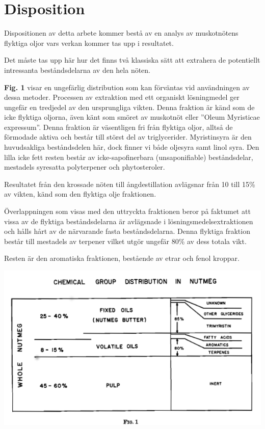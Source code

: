 \documentclass[a4paper,margin=3.25cm]{article}
\begin{document}
	\section{Disposition}

Dispositionen av detta arbete kommer bestå av en analys av muskotnötens flyktiga oljor
vars verkan kommer tas upp i resultatet.

Det måste tas upp här hur det finns två klassiska sätt att extrahera de potentiellt intressanta beståndsdelarna av den hela nöten.

\textbf{Fig. 1} \cite{shulgin1967chemistry} visar en ungefärlig distribution som kan förväntas vid användningen av dessa metoder. Processen av extraktion med ett organiskt lösningmedel ger ungefär en tredjedel av den ursprungliga vikten. Denna fraktion är känd som de icke flyktiga oljorna, även känt som smöret av muskotnöt eller ''Oleum Myristicae expressum''. Denna fraktion är väsentligen fri från flyktiga oljor, alltså de förmodade aktiva och består till störst del av triglycerider. Myristinsyra är den huvudsakliga beståndsdelen här, dock finner vi både oljesyra samt linol syra. Den lilla icke fett resten består av icke-sapofinerbara (unsaponifiable) beståndsdelar, mestadels syresatta polyterpener och phytosteroler. \cite{shulgin1967chemistry}

Resultatet från den krossade nöten till ångdestillation avlägsnar från 10 till 15\% av vikten, känd som den flyktiga olje fraktionen.

Överlappningen som visas med den uttryckta fraktionen beror på faktumet att vissa av de flyktiga beståndsdelarna är avlägsnade i lösningsmedelsextraktionen och hålls hårt av de närvarande fasta beståndsdelarna.
Denna flyktiga fraktion består till mestadels av terpener vilket utgör ungefär 80\% av dess totala vikt.

Resten är den aromatiska fraktionen, bestående av etrar och fenol kroppar.\cite{shulgin1967chemistry}


 \centerline{\includegraphics[scale=0.5]{Figure1}}
\end{document}
